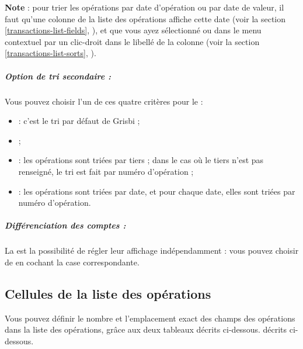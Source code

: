 \textbf{Note} : pour trier les opérations par date d'opération ou par date de valeur, il faut qu'une colonne de la liste des opérations affiche cette date (voir la section \vref{transactions-list-fields}, ), et que vous ayez sélectionné  ou  dans le menu contextuel par un clic-droit dans le libellé de la colonne (voir la section \vref{transactions-list-sorts}, ).


\subparagraph{Option de tri secondaire :}

Vous pouvez choisir l'un de ces quatre critères pour le  :

\begin{itemize}
	\item {} : c'est le tri par défaut de Grisbi ;
	\item {} ;
	\item {} : les opérations sont triées par tiers ; dans le cas où le tiers n'est pas renseigné, le tri est fait par numéro d'opération ;
	\item {} : les opérations sont triées par date, et pour chaque date, elles sont triées par numéro d'opération.
\end{itemize}


\subparagraph{Différenciation des comptes :\label{setup-operations-list-differenciation}}

La 
 est la possibilité de régler leur affichage indépendamment : vous pouvez choisir de  en cochant la case correspondante.





\subsection{Cellules de la liste des opérations\label{setup-operations-cells}}

Vous pouvez définir le nombre et l'emplacement exact des champs des opérations dans la liste des opérations, grâce aux deux tableaux 
\ifIllustration décrits ci-dessous.
\else décrits ci-dessous.
\fi


